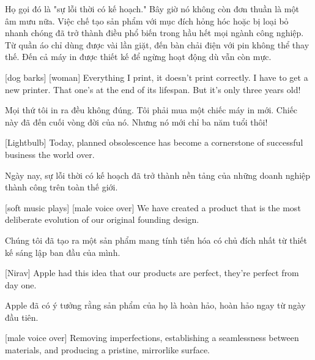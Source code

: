 \documentclass[a4paper]{article}
\begin{document}
	\begin{vietnamese-v2}
		 Họ gọi đó là "sự lỗi thời có kế hoạch." Bây giờ nó không còn đơn thuần là một âm mưu nữa. Việc chế tạo sản phẩm với mục đích hỏng hóc hoặc bị loại bỏ nhanh chóng đã trở thành điều phổ biến trong hầu hết mọi ngành công nghiệp. Từ quần áo chỉ dùng được vài lần giặt, đến bàn chải điện với pin không thể thay thế. Đến cả máy in được thiết kế để ngừng hoạt động dù vẫn còn mực.
	\end{vietnamese-v2}
	
	[dog barks]
	[woman] Everything I print, it doesn't print correctly.
	I have to get a new printer. That one's at the end of its lifespan.
	But it's only three years old!
	
	\begin{vietnamese-v2}
		 Mọi thứ tôi in ra đều không đúng. 
		Tôi phải mua một chiếc máy in mới. Chiếc này đã đến cuối vòng đời của nó. 
		Nhưng nó mới chỉ ba năm tuổi thôi!
	\end{vietnamese-v2}
	
	[Lightbulb] Today, planned obsolescence has become a cornerstone of successful business the world over.
	
	\begin{vietnamese-v2}
		 Ngày nay, sự lỗi thời có kế hoạch đã trở thành nền tảng của những doanh nghiệp thành công trên toàn thế giới.
	\end{vietnamese-v2}
	
	[soft music plays]
	[male voice over] We have created a product that is the most deliberate evolution of our original founding design.
	
	\begin{vietnamese-v2}
		 Chúng tôi đã tạo ra một sản phẩm mang tính tiến hóa có chủ đích nhất từ thiết kế sáng lập ban đầu của mình.
	\end{vietnamese-v2}
	
	[Nirav] Apple had this idea that our products are perfect, they're perfect from day one.
	
	\begin{vietnamese-v2}
		[Nirav] Apple đã có ý tưởng rằng sản phẩm của họ là hoàn hảo, hoàn hảo ngay từ ngày đầu tiên.
	\end{vietnamese-v2}
	
	[male voice over] Removing imperfections, establishing a seamlessness between materials, and producing a pristine, mirrorlike surface.
\end{document}
